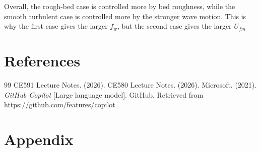 \documentclass[a4paper]{article}
\begin{document}
Overall, the rough-bed case is controlled more by bed roughness, while the smooth turbulent case is controlled more by the stronger wave motion. This is why the first case gives the larger $f_w$, but the second case gives the larger $U_{fm}$

\newpage
\renewcommand{\refname}{}
\section{References}
\vspace{-1cm}
\begin{thebibliography}{99}
     CE591 Lecture Notes. (2026). 
     CE580 Lecture Notes. (2026).
     Microsoft. (2021). \textit{GitHub Copilot} [Large language model]. GitHub. Retrieved from \url{https://github.com/features/copilot}
\end{thebibliography}

\newpage
\appendix

\section{Appendix}
\end{document}
